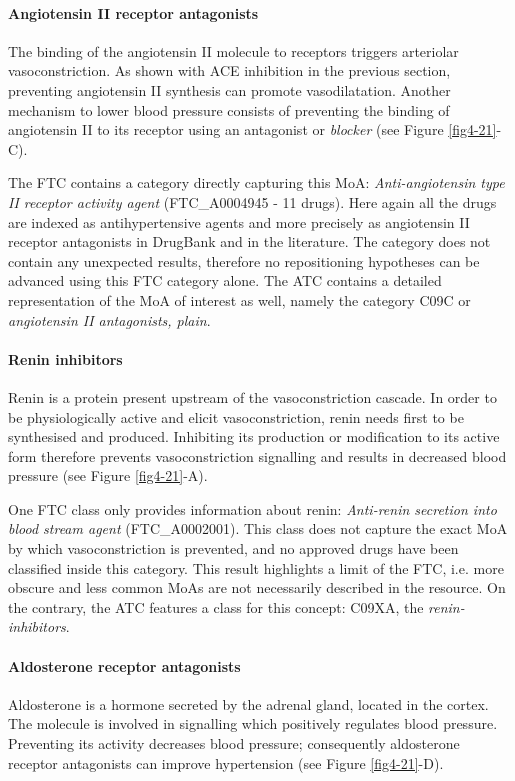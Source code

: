 \paragraph{\textbf{Angiotensin II receptor antagonists}\\}
The binding of the angiotensin II molecule to receptors triggers arteriolar vasoconstriction. As shown with ACE inhibition in the previous section, preventing angiotensin II synthesis can promote vasodilatation. Another mechanism to lower blood pressure consists of preventing the binding of angiotensin II to its receptor using an antagonist or \emph{blocker} (see Figure \ref{fig4-21}-C).

The FTC contains a category directly capturing this MoA: \emph{Anti-angiotensin type II receptor activity agent} (FTC\_A0004945 - 11 drugs). Here again all the drugs are indexed as antihypertensive agents and more precisely as angiotensin II receptor antagonists in DrugBank and in the literature. The category does not contain any unexpected results, therefore no repositioning hypotheses can be advanced using this FTC category alone. The ATC contains a detailed representation of the MoA of interest as well, namely the category C09C or \emph{angiotensin II antagonists, plain}.

\paragraph{\textbf{Renin inhibitors}\\}
Renin is a protein present upstream of the vasoconstriction cascade. In order to be physiologically active and elicit vasoconstriction, renin needs first to be synthesised and produced. Inhibiting its production or modification to its active form therefore prevents vasoconstriction signalling and results in decreased blood pressure (see Figure \ref{fig4-21}-A).

One FTC class only provides information about renin: \emph{Anti-renin secretion into blood stream agent} (FTC\_A0002001). This class does not capture the exact MoA by which vasoconstriction is prevented, and no approved drugs have been classified inside this category. This result highlights a limit of the FTC, i.e. more obscure and less common MoAs are not necessarily described in the resource. On the contrary, the ATC features a class for this concept: C09XA, the \emph{renin-inhibitors}.

\paragraph{\textbf{Aldosterone receptor antagonists}\\}
Aldosterone is a hormone secreted by the adrenal gland, located in the cortex. The molecule is involved in signalling which positively regulates blood pressure. Preventing its activity decreases blood pressure; consequently aldosterone receptor antagonists can improve hypertension (see Figure \ref{fig4-21}-D).

